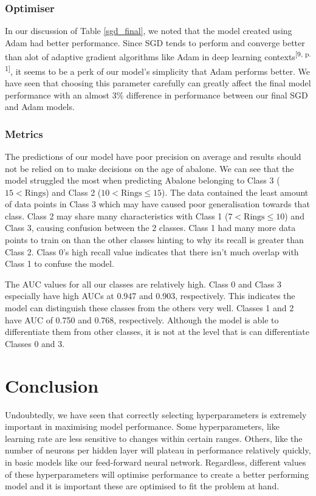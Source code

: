 \documentclass[conference]{IEEEtran}
\begin{document}
\text{}

\subsubsection{Optimiser}
In our discussion of Table \ref{sgd_final}, we noted that the model created using Adam had better performance. Since SGD tends to perform and converge better than alot of adaptive gradient algorithms like Adam in deep learning contexts\textsuperscript{[9, p. 1]}, it seems to be a perk of our model's simplicity that Adam performs better. We have seen that choosing this parameter carefully can greatly affect the final model performance with an almost 3\% difference in performance between our final SGD and Adam models.

\text{}

\subsubsection{Metrics}
The predictions of our model have poor precision on average and results should not be relied on to make decisions on the age of abalone. We can see that the model struggled the most when predicting Abalone belonging to Class 3 ($15 < \text{Rings}$) and Class 2 ($10 < \text{Rings} \leq 15$). 
The data contained the least amount of data points in Class 3 which may have caused poor generalisation towards that class. Class 2 may share many characteristics with Class 1 ($7 < \text{Rings} \leq 10$) and Class 3, causing confusion between the 2 classes. Class 1 had many more data points to train on than the other classes  hinting to why its recall is greater than Class 2. Class 0's high recall value indicates that there isn't much overlap with Class 1 to confuse the model. 

The AUC values for all our classes are relatively high. Class 0 and Class 3 especially have high AUCs at 0.947 and 0.903, respectively. This indicates the model can distinguish these classes from the others very well. Classes 1 and 2 have AUC of 0.750 and 0.768, respectively. Although the model is able to differentiate them from other classes, it is not at the level that is can differentiate Classes 0 and 3.


\section{Conclusion}
Undoubtedly, we have seen that correctly selecting hyperparameters is extremely important in maximising model performance. Some hyperparameters, like learning rate are less sensitive to changes within certain ranges. Others, like the number of neurons per hidden layer will plateau in performance relatively quickly, in basic models like our feed-forward neural network. Regardless, different values of these hyperparameters will optimise performance to create a better performing model and it is important these are optimised to fit the problem at hand.
\end{document}
